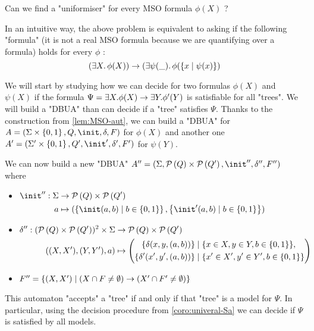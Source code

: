 \documentclass{article}
\begin{document}
\begin{problem}
Can we find a "uniformiser" for every MSO formula $\phi(X)$ ?
\end{problem}


In an intuitive way, the above problem is equivalent to asking if the following "formula" (it is not a real MSO formula
because we are quantifying over a formula) holds for every $\phi$ :
\[ (\exists X.\, \phi(X)) \rightarrow (\exists \psi(\_).\, \phi(\left\{x \mid \psi(x)\right\} ) \]


We will start by studying how we can decide for two formulas $\phi(X)$ and $\psi(X)$ if the formula $\Psi = \exists X. \phi (X) \rightarrow \exists Y. \phi' (Y)$
is satisfiable for all "trees". We will build a "DBUA" than can decide if a "tree" satisfies $\Psi$.
Thanks to the construction from \ref{lem:MSO-aut}, we can build a "DBUA" for $A = (\Sigma \times \set{0,1}, Q, \init, \delta, F)$ for $\phi(X)$
and another one $A' = (\Sigma' \times \set{0,1}, Q', \init', \delta', F')$ for $\psi(Y)$.

We can now build a new "DBUA" $A'' = (\Sigma, \parts Q \times \parts {Q'}, \init'', \delta'', F'')$ where
\begin{itemize}
	\item$\begin{aligned}[t]
			      \init'' : \Sigma & \to      \parts Q \times \parts {Q'}                                                          \\
			      a                & \mapsto  ( \setdef{ \init(a,b) } {b \in \set{0,1}}, \setdef{ \init'(a,b) } {b \in \set{0,1}})
		      \end{aligned}$

	\item$\begin{aligned}[t]
			      \delta'' : (\mathcal{P}\left(Q\right) \times \mathcal{P}\left(Q'\right))^2 \times \Sigma & \to      \mathcal{P}\left(Q\right) \times \mathcal{P}\left(Q'\right)                                                      \\
			      ((X,X'),(Y,Y'),a)                                        & \mapsto \left(\begin{aligned}
					                                                                               \{ \delta(x,y,(a,b)) \}   & \mid  \{x \in X, y \in Y, b \in \left\{0,1\right\}\},    \\
					                                                                               \{ \delta'(x',y',(a,b))\} & \mid  \{x' \in X', y' \in Y', b \in \left\{0,1\right\}\}
				                                                                               \end{aligned}\right)
		      \end{aligned}$

	\item $F'' = \left\{(X,X') \mid (X \cap F \neq \emptyset) \rightarrow (X' \cap F' \neq \emptyset)\right\}$
\end{itemize}
This automaton "accepts" a "tree" if and only if that "tree" is a model for $\Psi$. In particular, using the decision procedure
from \ref{coro:univeral-Sa} we can decide if $\Psi$ is satisfied by all models.
\end{document}

